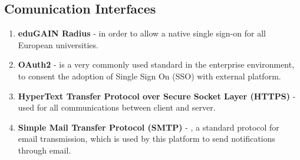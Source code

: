 \subsection{Comunication Interfaces}
\begin{enumerate}
    \item \textbf{eduGAIN Radius} - in order to allow a native single sign-on for all European universities. \cite{eduGAIN}
    \item \textbf{OAuth2} - is a very commonly used standard in the enterprise environment, to consent the adoption of Single Sign On (SSO) with external platform.
    \item \textbf{HyperText Transfer Protocol over Secure Socket Layer (HTTPS)} - used for all communications between client  and server.
    \item \textbf{Simple Mail Transfer Protocol (SMTP)} - , a standard protocol for email transmission, which is used by this platform to send notifications through email.
\end{enumerate}

